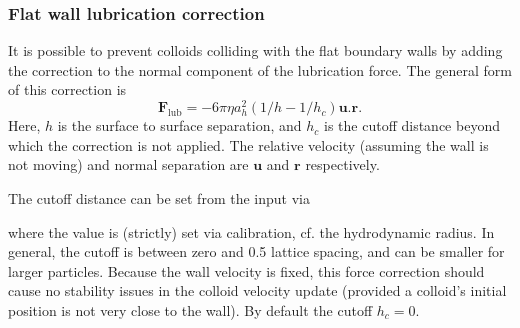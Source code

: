 

\subsubsection{Flat wall lubrication correction}

It is possible to prevent colloids colliding with the flat boundary walls
by adding the correction to the normal component of the lubrication
force. The general form of this correction is
\begin{equation}
\mathbf{F}_{\mathrm{lub}} = -6\pi \eta a_h^2
(1/h - 1/h_c)
\mathbf{u} . \mathbf{r}.
\end{equation}
Here, $h$ is the surface to surface separation, and $h_c$ is the cutoff
distance beyond which the correction is not applied. The relative
velocity (assuming the wall is not moving) and normal separation are
$\mathbf{u}$ and $\mathbf{r}$ respectively.

The cutoff distance can be set from the input via


where the value is (strictly) set via calibration, cf. the hydrodynamic
radius. In general, the cutoff is between zero and 0.5 lattice spacing,
and can be smaller for larger particles. Because the wall velocity is
fixed, this force correction should cause no stability issues in the
colloid velocity update (provided a colloid's initial position is not
very close to the wall). By default the cutoff $h_c = 0$.

